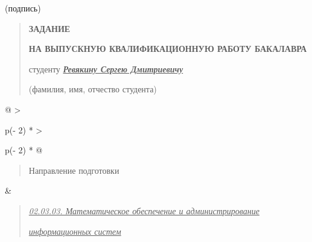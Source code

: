 (подпись)

\begin{quote}
\textbf{ЗАДАНИЕ}

\textbf{НА ВЫПУСКНУЮ КВАЛИФИКАЦИОННУЮ РАБОТУ БАКАЛАВРА}

студенту \emph{\textbf{\ul{Ревякину Сергею Дмитриевичу}}}

(фамилия, имя, отчество студента)
\end{quote}

\begin{longtable}[]{@{}
  >{\raggedright\arraybackslash}p{(\columnwidth - 2\tabcolsep) * }
  >{\raggedright\arraybackslash}p{(\columnwidth - 2\tabcolsep) * }@{}}
\toprule\noalign{}
\begin{minipage}[b]{\linewidth}\raggedright
\begin{quote}
Направление подготовки
\end{quote}
\end{minipage} & \begin{minipage}[b]{\linewidth}\raggedright
\begin{quote}
\emph{\ul{02.03.03. Математическое обеспечение и администрирование}}

\emph{\ul{информационных систем}}
\end{quote}
\end{minipage} \\
\midrule\noalign{}
\endhead
\bottomrule\noalign{}
\endlastfoot
\end{longtable}

